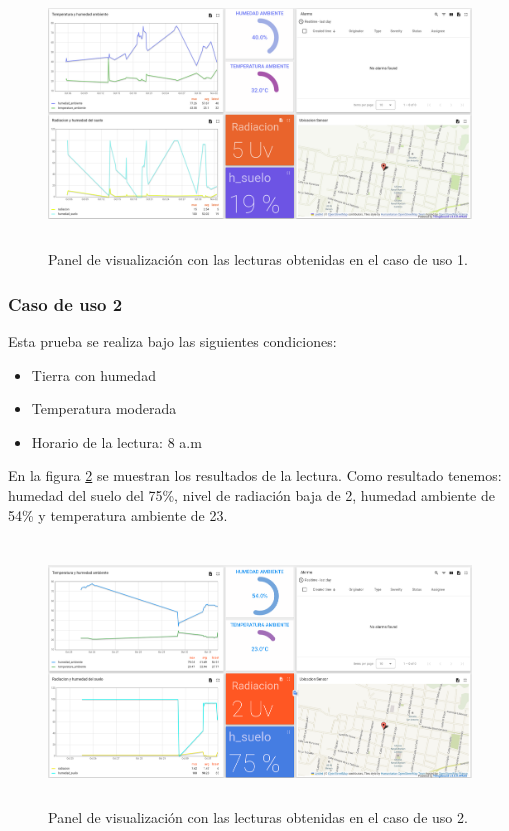 \begin{figure}[h!]
  \centering
    \includegraphics[width=\linewidth, height=7cm]{./Figures/tb_prueba1.png}
  \caption{Panel de visualización con las lecturas obtenidas en el caso de uso 1.}
    \label{fig:Lectura tierra seca tb}
\end{figure}

\subsubsection{Caso de uso 2}
Esta prueba se realiza bajo las siguientes condiciones:
\begin{itemize}
  \item Tierra con humedad
  \item Temperatura moderada
  \item Horario de la lectura: 8 a.m
\end{itemize}

En la figura \ref{fig:Humedad alta ThingsBoard} se muestran los resultados de la lectura. Como resultado tenemos: humedad del suelo del 75\%, nivel de radiación baja de 2, humedad ambiente de 54\% y temperatura ambiente de 23\textcelsius.
\clearpage

\begin{figure}[h!]
  \centering
    \includegraphics[width=\linewidth, height=7cm]{./Figures/humedad_alta_tb.png}
  \caption{Panel de visualización con las lecturas obtenidas en el caso de uso 2.}
    \label{fig:Humedad alta ThingsBoard}
\end{figure}
